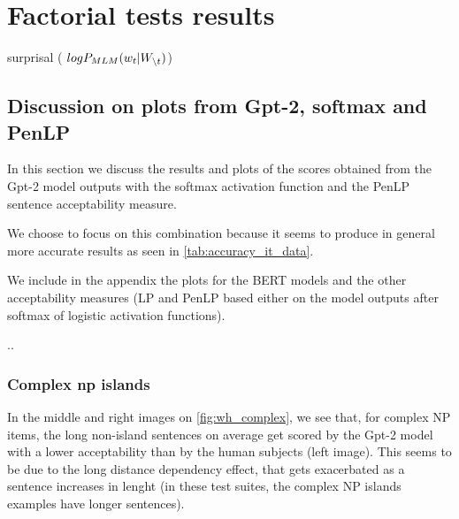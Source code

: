 \section{Factorial tests results}
surprisal ( $\displaystyle\-log P_{MLM} (w_t | W_{\setminus t}) $)


\subsection{Discussion on plots from Gpt-2, softmax and PenLP}

In this section we discuss the results and plots of the scores obtained from the Gpt-2 model outputs with the softmax activation function and the PenLP sentence acceptability measure. 

We choose to focus on this combination because it seems to produce in general more accurate results as seen in \autoref{tab:accuracy_it_data}. 

We include in the appendix the plots for the BERT models and the other acceptability measures (LP and PenLP based either on the model outputs after softmax of logistic activation functions).

..


\subsubsection{Complex np islands}

In the middle and right images on \autoref{fig:wh_complex}, we see that, for complex NP items, the long non-island sentences on average get scored by the Gpt-2 model with a lower acceptability than by the human subjects (left image). This seems to be due to the long distance dependency effect, that gets exacerbated as a sentence increases in lenght (in these test suites, the complex NP islands examples have longer sentences).

